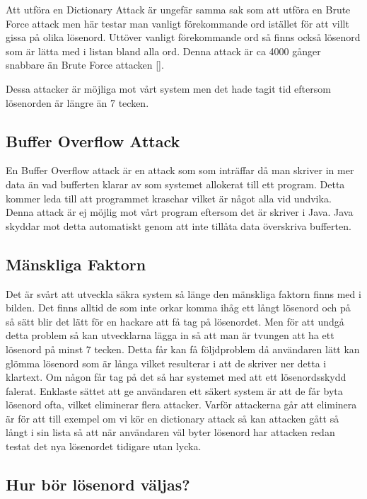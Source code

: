 Att utföra en Dictionary Attack är ungefär samma sak som att utföra en Brute Force attack men här testar man vanligt förekommande ord istället för att villt gissa på olika lösenord. Uttöver vanligt förekommande ord så finns också lösenord som är lätta med i listan bland alla ord. Denna attack är ca 4000 gånger snabbare än Brute Force attacken [\cite{F4}]. 

Dessa attacker är möjliga mot vårt system men det hade tagit tid eftersom lösenorden är längre än 7 tecken.

\subsection{Buffer Overflow Attack}

En Buffer Overflow attack är en attack som som inträffar då man skriver in mer data än vad bufferten klarar av som systemet allokerat till ett program. Detta kommer leda till att programmet kraschar vilket är något alla vid undvika. Denna attack är ej möjlig mot vårt program eftersom det är skriver i Java. Java skyddar mot detta automatiskt genom att inte tillåta data överskriva bufferten.

\subsection{Mänskliga Faktorn}

Det är svårt att utveckla säkra system så länge den mänskliga faktorn finns med i bilden. Det finns alltid de som inte orkar komma ihåg ett långt lösenord och på så sätt blir det lätt för en hackare att få tag på lösenordet. Men för att undgå detta problem så kan utvecklarna lägga in så att man är tvungen att ha ett lösenord på minst 7 tecken. Detta får kan få följdproblem då användaren lätt kan glömma lösenord som är långa vilket resulterar i att de skriver ner detta i klartext. Om någon får tag på det så har systemet med att ett lösenordsskydd falerat. Enklaste sättet att ge användaren ett säkert system är att de får byta lösenord ofta, vilket eliminerar flera attacker. Varför attackerna går att eliminera är för att till exempel om vi kör en dictionary attack så kan attacken gått så långt i sin lista så att när användaren väl byter lösenord har attacken redan testat det nya lösenordet tidigare utan lycka. 

\subsection{Hur bör lösenord väljas?}

